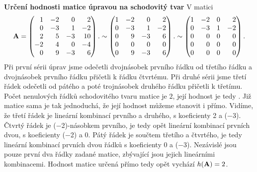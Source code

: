 \begin{mdframed}[style=mdexam]
  \begin{example}\label{MAI:exam083} 
    \textbf{Určení hodnosti matice úpravou na schodovitý tvar}\newline
    V matici
    \begin{gather*} 
      \matr{A} = 
        \begin{pmatrix*}[r]
             1 & -2 &  0 &  2  \\
             0 & -3 &  1 & -2  \\
             2 &  5 & -3 & 10  \\
            -2 &  4 &  0 & -4  \\
             0 &  9 & -3 &  6
        \end{pmatrix*}. \sim
        \begin{pmatrix*}[r]
            1 & -2 &  0 &  2  \\
            0 & -3 &  1 & -2  \\
            0 &  9 & -3 &  6  \\
            0 &  0 &  0 &  0  \\
            0 &  9 & -3 &  6
        \end{pmatrix*}. \sim
        \begin{pmatrix*}[r]
            1 & -2 &  0 &  2  \\
            0 & -3 &  1 & -2  \\
            0 &  0 &  0 &  0  \\
            0 &  0 &  0 &  0  \\
            0 &  0 &  0 &  0
        \end{pmatrix*}.
    \end{gather*}
    Při první sérii úprav jsme odečetli dvojnásobek prvního řádku od třetího řádku a dvojnásobek
    prvního řádku přičetli k řádku čtvrtému. Při druhé sérii jsme třetí řádek odečetli od pátého a
    poté trojnásobek druhého řádku přičetli k třetímu. Počet nenulových řádků schodovitého tvaru
    matice je \(\num{2}\), její hodnost je tedy . Již matice sama je tak jednoduchá, že její hodnost
    můžeme stanovit i přímo. Vidíme, že třetí řádek je lineární kombinací prvního a druhého, s
    koeficienty \num{2} a (\num{-3}). Čtvrtý řádek je (\num{-2})-násobkem prvního, je tedy opět
    lineární kombinací prvních dvou, s koeficienty (\num{-2}) a \num{0}. Pátý řádek je součtem
    třetího a čtvrtého, je tedy lineární kombinací prvních dvou řádků s koeficienty \num{0} a
    (\num{-3}). Nezávislé jsou pouze první dva řádky zadané matice, zbývající jsou jejich lineárními
    kombinacemi. Hodnost matice určená přímo tedy opět vychází \(h(\mathbf{A}) = 2\).
  \end{example}
\end{mdframed}